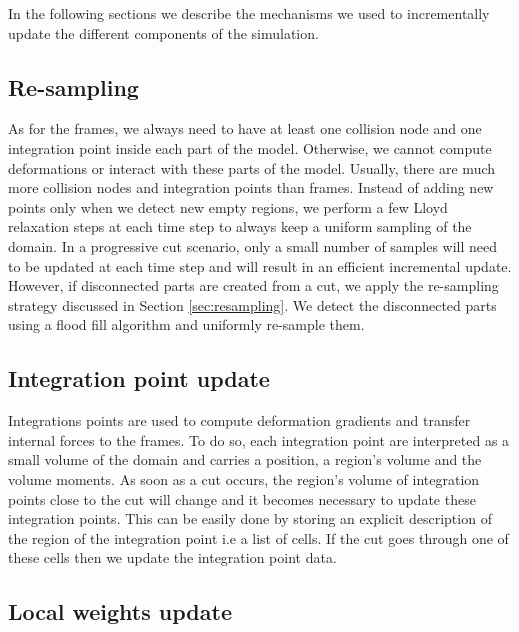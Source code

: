 In the following sections we describe the mechanisms we used to incrementally update the different components of the simulation.

\subsection{Re-sampling}
\label{sec:all_resampling}
As for the frames, we always need to have at least one collision node and one integration point inside each part of the model. Otherwise, we cannot compute deformations or interact with these parts of the model. Usually, there are much more collision nodes and integration points than frames. Instead of adding new points only when we detect new empty regions, we perform a few Lloyd relaxation steps at each time step to always keep a uniform sampling of the domain. In a progressive cut scenario, only a small number of samples will need to be updated at each time step and will result in an efficient incremental update. However, if disconnected parts are created from a cut, we apply the re-sampling strategy discussed in Section \ref{sec:resampling}. We detect the disconnected parts using a flood fill algorithm and uniformly re-sample them.

\subsection{Integration point update}
\label{sec:gausspointupdate}

Integrations points are used to compute deformation gradients and transfer internal forces to the frames. To do so, each integration point are interpreted as a small volume of the domain and carries a position, a region's volume and the volume moments. As soon as a cut occurs, the region's volume of integration points close to the cut will change and it becomes necessary to update these integration points. This can be easily done by storing an explicit description of the region of the integration point i.e a list of cells. If the cut goes through one of these cells then we update the integration point data.

\subsection{Local weights update} \label{sec:interpolation}

